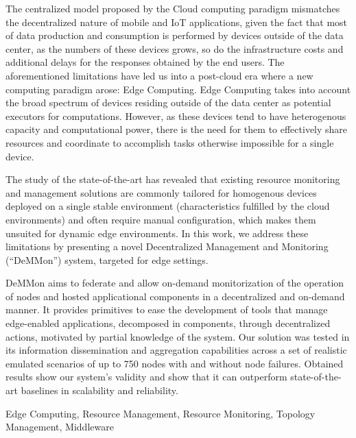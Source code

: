 

The centralized model proposed by the Cloud computing paradigm mismatches the decentralized nature of mobile and IoT applications, given the fact that most of data production and consumption is performed by devices outside of the data center, as the numbers of these devices grows, so do the infrastructure costs and additional delays for the responses obtained by the end users. The aforementioned limitations have led us into a post-cloud era where a new computing paradigm arose: Edge Computing. Edge Computing takes into account the broad spectrum of devices residing outside of the data center as potential executors for computations. However, as these devices tend to have heterogenous capacity and computational power, there is the need for them to effectively share resources and coordinate to accomplish tasks otherwise impossible for a single device. 

The study of the state-of-the-art has revealed that existing resource monitoring and management solutions are commonly tailored for homogenous devices deployed on a single stable environment (characteristics fulfilled by the cloud environments) and often require manual configuration, which makes them unsuited for dynamic edge environments. In this work, we address these limitations by presenting a novel Decentralized Management and Monitoring (``DeMMon'') system, targeted for edge settings. 

DeMMon aims to federate and allow on-demand monitorization of the operation of nodes and hosted applicational components in a decentralized and on-demand manner. It provides primitives to ease the development of tools that manage edge-enabled applications, decomposed in components, through decentralized actions, motivated by partial knowledge of the system. Our solution was tested in its information dissemination and aggregation capabilities across a set of realistic emulated scenarios of up to 750 nodes with and without node failures. Obtained results show our system's validity and show that it can outperform state-of-the-art baselines in scalability and reliability. 

\begin{keywords}
  Edge Computing, Resource Management, Resource Monitoring, Topology Management, Middleware
\end{keywords} 
